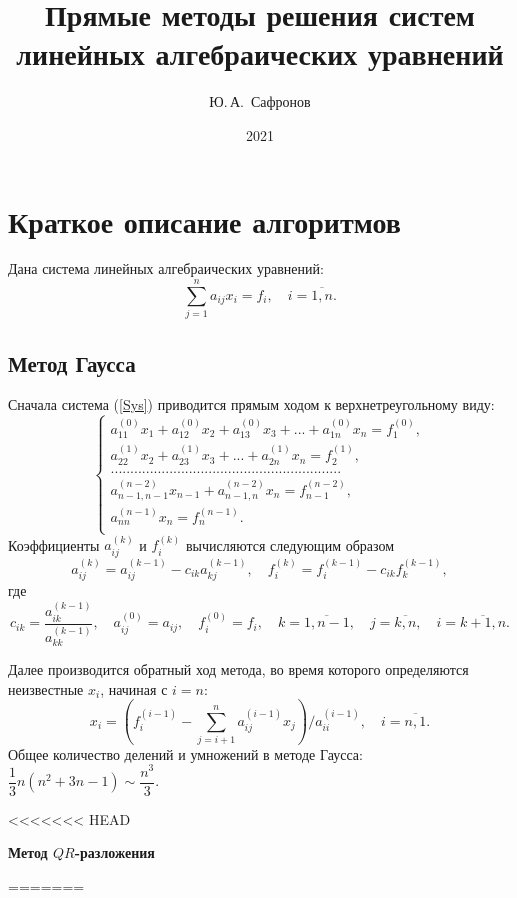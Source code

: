 \documentclass[12pt, a4paper]{article}
\title{Прямые методы решения систем линейных алгебраических уравнений}
\author{Ю.\,А.~Сафронов}
\date{2021}
\begin{document}
\maketitle
\tableofcontents 
\newpage

\section{Краткое описание алгоритмов}
Дана система линейных алгебраических уравнений:
\begin{equation}
\sum_{j=1}^{n} a_{ij}x_i = f_i , \quad i = \overline{1,n}.
\label{Sys}
\end{equation}

\subsection{Метод Гаусса}
Сначала система (\ref{Sys}) приводится прямым ходом к верхнетреугольному виду: 
\[\left\{
\begin{aligned}
a_{11}^{(0)}x_1 + a_{12}^{(0)}x_2 + a_{13}^{(0)}x_3 + ... + a_{1n}^{(0)}x_n = f_1^{(0)},\\
a_{22}^{(1)}x_2 + a_{23}^{(1)}x_3 + ... + a_{2n}^{(1)}x_n = f_2^{(1)},\\
...........................................................\\
a_{n-1,n-1}^{(n-2)}x_{n-1} + a_{n-1,n}^{(n-2)}x_n = f_{n-1}^{(n-2)},\\
a_{nn}^{(n-1)}x_n = f_{n}^{(n-1)}.\\
\end{aligned}
\right.
\]
Коэффициенты $a_{ij}^{(k)}$ и $f_i^{(k)}$ вычисляются следующим образом
\[
a_{ij}^{(k)} = a_{ij}^{(k-1)} - c_{ik}a_{kj}^{(k-1)}, \quad f_{i}^{(k)} = f_{i}^{(k-1)} - c_{ik}f_{k}^{(k-1)}, 
\]
где
\[
c_{ik} = \dfrac{a_{ik}^{(k-1)}}{a_{kk}^{(k-1)}}, \quad a_{ij}^{(0)}=a_{ij}, \quad f_{i}^{(0)} = f_i, \quad k = \overline{1,n-1},\quad j =\overline{k,n}, \quad i = \overline{k+1,n}.
\]

Далее производится обратный ход метода, во время которого определяются неизвестные $x_i$, начиная с $i = n$:
\[
x_i =\left(f_i^{(i-1)}-\sum_{j=i+1}^{n} a_{ij}^{(i-1)}x_j\right)/a_{ii}^{(i-1)}, \quad i = \overline{n,1}.
\]
Общее количество делений и умножений в методе Гаусса: $\dfrac{1}{3}n(n^2+3n-1) \sim \dfrac{n^3}{3}$.

\newpage

<<<<<<< HEAD
\begin{center}
    {\textbf 
        {Метод $QR$-разложения
        }
    }
\end{center}
=======
\end{document}
